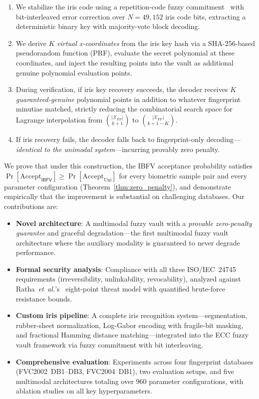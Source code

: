 \documentclass[conference]{IEEEtran}
\newcommand{\IBFV}{\textsf{IBFV}}
\begin{document}
\begin{enumerate}
    \item We stabilize the iris code using a repetition-code fuzzy commitment~\cite{hao2006combining} with bit-interleaved error correction over $N = 49{,}152$ iris code bits, extracting a deterministic binary key with majority-vote block decoding.
    \item We derive $K$ \emph{virtual x-coordinates} from the iris key hash via a SHA-256-based pseudorandom function (PRF), evaluate the secret polynomial at these coordinates, and inject the resulting points into the vault as additional genuine polynomial evaluation points.
    \item During verification, if iris key recovery succeeds, the decoder receives $K$ \emph{guaranteed-genuine} polynomial points in addition to whatever fingerprint minutiae matched, strictly reducing the combinatorial search space for Lagrange interpolation from $\binom{|\mathcal{X}_{\text{FP}}|}{k+1}$ to $\binom{|\mathcal{X}_{\text{FP}}|}{k+1-K}$.
    \item If iris recovery fails, the decoder falls back to fingerprint-only decoding---\emph{identical to the unimodal system}---incurring provably zero penalty.
\end{enumerate}

We prove that under this construction, the \IBFV{} acceptance probability satisfies $\Pr[\text{Accept}_{\IBFV}] \geq \Pr[\text{Accept}_{\text{Uni}}]$ for every biometric sample pair and every parameter configuration (Theorem~\ref{thm:zero_penalty}), and demonstrate empirically that the improvement is substantial on challenging databases. Our contributions are:

\begin{itemize}
    \item \textbf{Novel architecture}: A multimodal fuzzy vault with a \emph{provable zero-penalty guarantee} and graceful degradation---the first multimodal fuzzy vault architecture where the auxiliary modality is guaranteed to never degrade performance.
    \item \textbf{Formal security analysis}: Compliance with all three ISO/IEC~24745 requirements (irreversibility, unlinkability, revocability), analyzed against Ratha~\textit{et~al.}'s~\cite{ratha2001enhancing} eight-point threat model with quantified brute-force resistance bounds.
    \item \textbf{Custom iris pipeline}: A complete iris recognition system---segmentation, rubber-sheet normalization, Log-Gabor encoding with fragile-bit masking, and fractional Hamming distance matching---integrated into the ECC fuzzy vault framework via fuzzy commitment with bit interleaving.
    \item \textbf{Comprehensive evaluation}: Experiments across four fingerprint databases (FVC2002~DB1--DB3, FVC2004~DB1), two evaluation setups, and five multimodal architectures totaling over 960 parameter configurations, with ablation studies on all key hyperparameters.
\end{itemize}
\end{document}
